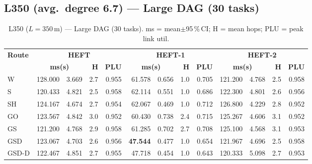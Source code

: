\documentclass[11pt]{article}
\newcommand{\win}[1]{\textcolor{green!50!black}{\textbf{#1}}}
\newcommand{\bad}[1]{\textcolor{red!70!black}{#1}}
\begin{document}
\subsection{L350 (avg.\ degree 6.7) --- Large DAG (30 tasks)}
\begin{table}[H]\centering\small
\begin{tabular}{l r@{$\pm$}l r r r@{$\pm$}l r r r@{$\pm$}l r r}
\toprule
\textbf{Route} & \multicolumn{4}{c}{\textbf{HEFT}} & \multicolumn{4}{c}{\textbf{HEFT-1}} & \multicolumn{4}{c}{\textbf{HEFT-2}} \\
\cmidrule(lr){2-5}\cmidrule(lr){6-9}\cmidrule(lr){10-13}
& \multicolumn{2}{c}{\textbf{ms(s)}} & \textbf{H} & \textbf{PLU}& \multicolumn{2}{c}{\textbf{ms(s)}} & \textbf{H} & \textbf{PLU}& \multicolumn{2}{c}{\textbf{ms(s)}} & \textbf{H} & \textbf{PLU} \\
\midrule
  W & \bad{128.000} & 3.669 & 2.7 & 0.955 & 61.578 & 0.656 & 1.0 & 0.705 & 121.200 & 4.768 & 2.5 & 0.958 \\
  S & 120.433 & 4.821 & 2.5 & 0.958 & \bad{62.114} & 0.551 & 1.0 & 0.686 & 122.300 & 4.801 & 2.6 & 0.956 \\
  SH & 124.167 & 4.674 & 2.7 & 0.954 & \bad{62.067} & 0.469 & 1.0 & 0.712 & \bad{126.800} & 4.229 & 2.8 & 0.952 \\
  GO & 123.567 & 4.842 & 3.0 & 0.952 & 60.430 & 0.738 & 2.4 & 0.715 & 125.267 & 4.606 & 3.1 & 0.952 \\
  GS & 121.200 & 4.768 & 2.9 & 0.958 & 61.285 & 0.702 & 2.7 & 0.708 & 125.100 & 4.568 & 3.1 & 0.953 \\
  GSD & 123.067 & 4.703 & 2.6 & 0.956 & \win{47.544} & 0.477 & 1.0 & 0.654 & 121.967 & 4.696 & 2.5 & 0.958 \\
  GSD-D & 122.467 & 4.851 & 2.7 & 0.955 & 47.718 & 0.454 & 1.0 & 0.643 & 120.333 & 5.098 & 2.7 & 0.953 \\
\bottomrule\end{tabular}
\caption{L350 ($L=350$\,m) --- Large DAG (30 tasks). ms = mean$\pm$95\,\%\,CI; H = mean hops; PLU = peak link util.}
\end{table}
\end{document}
